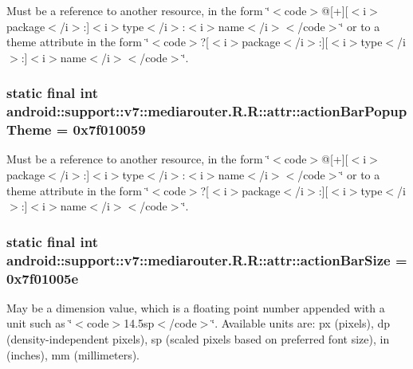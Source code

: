 Must be a reference to another resource, in the form \char`\"{}$<$code$>$@\mbox{[}+\mbox{]}\mbox{[}$<$i$>$package$<$/i$>$:\mbox{]}$<$i$>$type$<$/i$>$:$<$i$>$name$<$/i$>$$<$/code$>$\char`\"{} or to a theme attribute in the form \char`\"{}$<$code$>$?\mbox{[}$<$i$>$package$<$/i$>$:\mbox{]}\mbox{[}$<$i$>$type$<$/i$>$:\mbox{]}$<$i$>$name$<$/i$>$$<$/code$>$\char`\"{}. \hypertarget{classandroid_1_1support_1_1v7_1_1mediarouter_1_1_r_1_1attr_b13690ea2460d1261585c84b545de047}{
\subsubsection[{actionBarPopupTheme}]{\setlength{\rightskip}{0pt plus 5cm}static final int android::support::v7::mediarouter.R.R::attr::actionBarPopupTheme = 0x7f010059}}
\label{classandroid_1_1support_1_1v7_1_1mediarouter_1_1_r_1_1attr_b13690ea2460d1261585c84b545de047}


Must be a reference to another resource, in the form \char`\"{}$<$code$>$@\mbox{[}+\mbox{]}\mbox{[}$<$i$>$package$<$/i$>$:\mbox{]}$<$i$>$type$<$/i$>$:$<$i$>$name$<$/i$>$$<$/code$>$\char`\"{} or to a theme attribute in the form \char`\"{}$<$code$>$?\mbox{[}$<$i$>$package$<$/i$>$:\mbox{]}\mbox{[}$<$i$>$type$<$/i$>$:\mbox{]}$<$i$>$name$<$/i$>$$<$/code$>$\char`\"{}. \hypertarget{classandroid_1_1support_1_1v7_1_1mediarouter_1_1_r_1_1attr_5362ec94cac30b8e33f2f66424a08f04}{
\subsubsection[{actionBarSize}]{\setlength{\rightskip}{0pt plus 5cm}static final int android::support::v7::mediarouter.R.R::attr::actionBarSize = 0x7f01005e}}
\label{classandroid_1_1support_1_1v7_1_1mediarouter_1_1_r_1_1attr_5362ec94cac30b8e33f2f66424a08f04}


May be a dimension value, which is a floating point number appended with a unit such as \char`\"{}$<$code$>$14.5sp$<$/code$>$\char`\"{}. Available units are: px (pixels), dp (density-independent pixels), sp (scaled pixels based on preferred font size), in (inches), mm (millimeters). 

